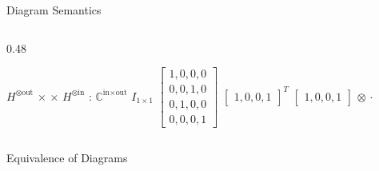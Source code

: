 \documentclass[final]{beamer}
\newlength{\colwidth}
\newcommand{\C}{\mathbb{C}}
\begin{document}
\begin{frame}[t]
\begin{columns}[t]
\begin{column}{\colwidth}
\begin{block}{Diagram Semantics}
\begin{columns}
\begin{column}{0.48\colwidth}
\begin{algorithm}[H]
\begin{algorithmic}
            \State \Return \(H^{\otimes\text{out}}\) \(\times\)  \(\times\) \(H^{\otimes\text{in}}\)
          \EndFunction
             : \(\C^{\text{in} \times \text{out}}\)
                  \State \Return $I_{1 \times 1}$ \EndCase
                  \State \Return \(\begin{bmatrix}1,0,0,0\\0,0,1,0\\0,1,0,0\\0,0,0,1\end{bmatrix}\) \EndCase
                  \State \Return \(\begin{bmatrix}1,0,0,1\end{bmatrix}^T\) \EndCase
                  \State \Return \(\begin{bmatrix}1,0,0,1\end{bmatrix}\) \EndCase
                  \State \Return {} \EndCase
                  \State \Return {} \EndCase
                  \State \Return {} $\otimes$  \EndCase
                  \State \Return {} $\cdot$  \EndCase
                \EndSwitch
            \EndFunction
          \end{algorithmic}
        \end{algorithm}
      \end{column}
    \end{columns}
  \end{block}

  \begin{block}{Equivalence of Diagrams}


\end{block}
\end{column}
\end{columns}
\end{frame}
\end{document}
